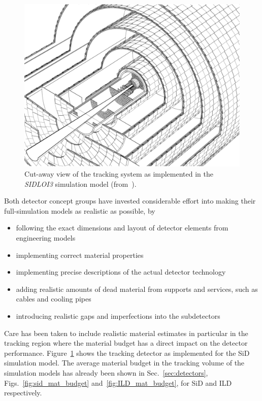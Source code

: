 \begin{figure}
\begin{center}
\includegraphics[width=0.80\hsize]{chapters/figures/SiD_tracker_simmodel.png}
\end{center}
\caption{Cut-away view of the tracking system as implemented in the \emph{SIDLOI3} simulation model (from~\cite{Behnke:2013lya}).}
\label{fig:sid_trk}
\end{figure}
Both detector concept groups have invested considerable effort into making their full-simulation models as realistic as possible, by
\begin{itemize}
\item following the exact dimensions and layout of detector elements from engineering models
\item implementing correct material properties
\item implementing precise descriptions of the actual detector technology
\item adding realistic amounts of dead material from supports and services, such as cables and cooling pipes
\item introducing realistic gaps and imperfections into the subdetectors
\end{itemize}
Care has been taken to include realistic material estimates in particular in the tracking region where
the material budget has a direct impact on the detector performance.
Figure~\ref{fig:sid_trk} shows the tracking detector as implemented for the SiD simulation model.
The average material budget in the tracking volume of the simulation models has already been shown in Sec.~\ref{sec:detectors}, Figs.~\ref{fig:sid_mat_budget}
and~\ref{fig:ILD_mat_budget}, for SiD and ILD respectively.

